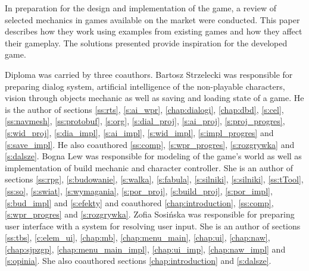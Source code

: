 In preparation for the design and implementation of the game, a review of selected mechanics in games available
on the market were conducted. This paper describes how they work using examples from existing games and how
they affect their gameplay. The solutions presented provide inspiration for the developed game.



Diploma was carried by three coauthors. Bartosz Strzelecki was responsible for preparing dialog system, artificial
intelligence of the non-playable characters, vision through objects mechanic as well as saving and loading state of a game.
He is the author of sections \ref{ss:rts},
\ref{s:ai_wpr}, \ref{chap:dialogi}, \ref{chap:dbd}, \ref{s:cel}, \ref{ss:navmesh}, \ref{ss:protobuf}, \ref{s:org},
\ref{s:dial_proj}, \ref{s:ai_proj}, \ref{s:proj_progres}, \ref{s:wid_proj}, \ref{s:dia_impl}, \ref{s:ai_impl}, \ref{s:wid_impl}, \ref{s:impl_progres} and
\ref{s:save_impl}. He also coauthored \ref{ss:comp}, \ref{s:wpr_progres}, \ref{s:rozgrywka} and \ref{s:dalsze}. Bogna Lew
was responsible for modeling of the game's world as well as implementation of build mechanic and character controller. She
is an author of sections \ref{ss:rpg}, \ref{s:budowanie}, \ref{s:walka}, \ref{s:fabula}, \ref{s:silniki}, \ref{s:silniki},
\ref{ss:tTool}, \ref{ss:so}, \ref{s:swiat}, \ref{s:wymagania}, \ref{s:por_proj}, \ref{s:build_proj}, \ref{s:por_impl}, \ref{s:bud_impl} and
\ref{s:efekty} and coauthored \ref{chap:introduction}, \ref{ss:comp}, \ref{s:wpr_progres} and \ref{s:rozgrywka}.
Zofia Sosińska was responsible for preparing user interface with a system for resolving user input. She is an author of
sections \ref{ss:tbs}, \ref{c:elem_ui}, \ref{chap:mb},
\ref{chap:menu_main}, \ref{chap:ui}, \ref{chap:naw}, \ref{chap:sjpzgp}, \ref{chap:menu_main_impl}, \ref{chap:ui_imp},
\ref{chap:naw_impl} and  \ref{s:opinia}. She also coauthored sections \ref{chap:introduction} and \ref{s:dalsze}.